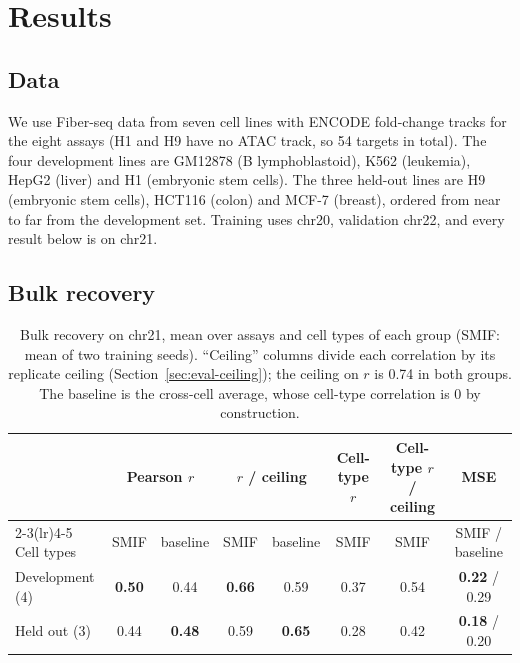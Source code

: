 \documentclass[acmtog,nonacm]{acmart}   %
\begin{document}
\section{Results}
\label{sec:results}


\subsection{Data}
\label{sec:data}

We use Fiber-seq data from seven cell lines with ENCODE fold-change tracks for the eight assays (H1 and H9 have no
ATAC track, so 54 targets in total). The four development lines are GM12878 (B lymphoblastoid), K562 (leukemia),
HepG2 (liver) and H1 (embryonic stem cells). The three held-out lines are H9 (embryonic stem cells), HCT116 (colon)
and MCF-7 (breast), ordered from near to far from the development set. Training uses chr20, validation chr22, and
every result below is on chr21.

\subsection{Bulk recovery}
\label{sec:res-bulk}

\begin{table}[t]
\caption{Bulk recovery on chr21, mean over assays and cell types of each group (SMIF: mean of two training seeds).
``Ceiling'' columns divide each correlation by its replicate ceiling (Section~\ref{sec:eval-ceiling}); the ceiling
on $r$ is 0.74 in both groups. The baseline is the cross-cell average, whose cell-type correlation is 0 by
construction.}
\label{tab:bulk}
\small
\begin{tabular}{@{}lccccccc@{}}
\toprule
& \multicolumn{2}{c}{Pearson $r$} & \multicolumn{2}{c}{$r$ / ceiling} & Cell-type $r$ & Cell-type $r$ / ceiling &
\multicolumn{1}{c}{MSE} \\
\cmidrule(lr){2-3}\cmidrule(lr){4-5}
Cell types & SMIF & baseline & SMIF & baseline & SMIF & SMIF & SMIF / baseline \\
\midrule
Development (4) & \textbf{0.50} & 0.44 & \textbf{0.66} & 0.59 & 0.37 & 0.54 & \textbf{0.22} / 0.29 \\
Held out (3) & 0.44 & \textbf{0.48} & 0.59 & \textbf{0.65} & 0.28 & 0.42 & \textbf{0.18} / 0.20 \\
\bottomrule
\end{tabular}
\end{table}
\end{document}

